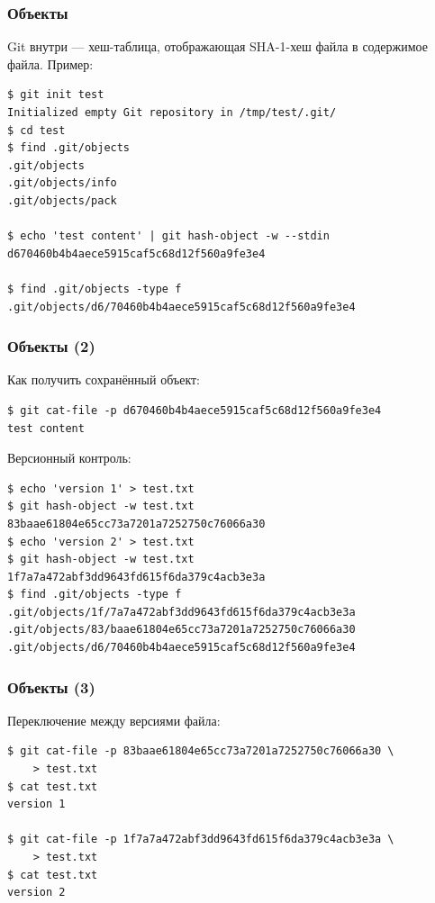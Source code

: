 \documentclass{../../slides-style}
\begin{document}
    \begin{frame}[fragile]
        \frametitle{Объекты}
        Git внутри --- хеш-таблица, отображающая SHA-1-хеш файла в содержимое файла. Пример:
        \begin{verbatim}
$ git init test
Initialized empty Git repository in /tmp/test/.git/
$ cd test
$ find .git/objects
.git/objects
.git/objects/info
.git/objects/pack

$ echo 'test content' | git hash-object -w --stdin
d670460b4b4aece5915caf5c68d12f560a9fe3e4

$ find .git/objects -type f
.git/objects/d6/70460b4b4aece5915caf5c68d12f560a9fe3e4
        \end{verbatim}
    \end{frame}

    \begin{frame}[fragile]
        \frametitle{Объекты (2)}
        Как получить сохранённый объект:
        \begin{verbatim}
$ git cat-file -p d670460b4b4aece5915caf5c68d12f560a9fe3e4
test content
        \end{verbatim}

        Версионный контроль:
        \begin{verbatim}
$ echo 'version 1' > test.txt
$ git hash-object -w test.txt
83baae61804e65cc73a7201a7252750c76066a30
$ echo 'version 2' > test.txt
$ git hash-object -w test.txt
1f7a7a472abf3dd9643fd615f6da379c4acb3e3a
$ find .git/objects -type f
.git/objects/1f/7a7a472abf3dd9643fd615f6da379c4acb3e3a
.git/objects/83/baae61804e65cc73a7201a7252750c76066a30
.git/objects/d6/70460b4b4aece5915caf5c68d12f560a9fe3e4
        \end{verbatim}
    \end{frame}

    \begin{frame}[fragile]
        \frametitle{Объекты (3)}
        Переключение между версиями файла:
        \begin{verbatim}
$ git cat-file -p 83baae61804e65cc73a7201a7252750c76066a30 \
    > test.txt
$ cat test.txt
version 1

$ git cat-file -p 1f7a7a472abf3dd9643fd615f6da379c4acb3e3a \
    > test.txt
$ cat test.txt
version 2
        \end{verbatim}
    \end{frame}
\end{document}

